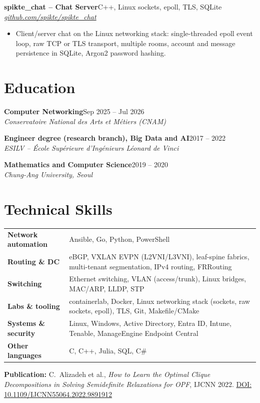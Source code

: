 \documentclass[9pt,a4paper]{extarticle}
\newcommand{\entry}[4]{%
  \textbf{#1}\hfill #2\\[-0.1em]
  \textit{#3}\hfill \textit{#4}\par\vspace{0.1em}}
\begin{document}
\entry{spikte\_chat -- Chat Server}{C++, Linux sockets, epoll, TLS, SQLite}{}{\href{https://github.com/spikte/spikte_chat}{github.com/spikte/spikte\_chat}}
\begin{itemize}
  \item Client/server chat on the Linux networking stack: single-threaded epoll event loop, raw TCP or TLS transport, multiple rooms, account and message persistence in SQLite, Argon2 password hashing.
\end{itemize}

\section{Education}
\entry{Computer Networking}{Sep 2025 -- Jul 2026}{Conservatoire National des Arts et M\'etiers (CNAM)}{}
\entry{Engineer degree (research branch), Big Data and AI}{2017 -- 2022}{ESILV -- \'Ecole Sup\'erieure d'Ing\'enieurs L\'eonard de Vinci}{}
\entry{Mathematics and Computer Science}{2019 -- 2020}{Chung-Ang University, Seoul}{}

\section{Technical Skills}
\begin{tabular}{@{}p{3.3cm}p{13.3cm}@{}}
\textbf{Network automation} & Ansible, Go, Python, PowerShell \\
\textbf{Routing \& DC} & eBGP, VXLAN EVPN (L2VNI/L3VNI), leaf-spine fabrics, multi-tenant segmentation, IPv4 routing, FRRouting \\
\textbf{Switching} & Ethernet switching, VLAN (access/trunk), Linux bridges, MAC/ARP, LLDP, STP \\
\textbf{Labs \& tooling} & containerlab, Docker, Linux networking stack (sockets, raw sockets, epoll), TLS, Git, Makefile/CMake \\
\textbf{Systems \& security} & Linux, Windows, Active Directory, Entra ID, Intune, Tenable, ManageEngine Endpoint Central \\
\textbf{Other languages} & C, C++, Julia, SQL, C\# \\
\end{tabular}

\vspace{0.3em}
{\small\textbf{Publication:} C.~Alizadeh et al., \textit{How to Learn the Optimal Clique Decompositions in Solving Semidefinite Relaxations for OPF}, IJCNN 2022. \href{https://ieeexplore.ieee.org/abstract/document/9891912}{DOI: 10.1109/IJCNN55064.2022.9891912}}
\end{document}
